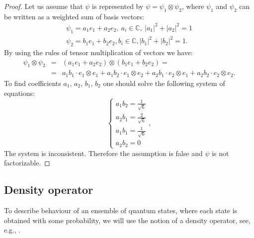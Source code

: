 \documentclass[%
master,         %
subf,           %
href,           %
colorlinks=true %
]{disser}
\numberwithin{equation}{section}
\numberwithin{figure}{section}
\begin{document}
\begin{proof}
Let us assume that $\psi$ is represented by $\psi = \psi_1\otimes\psi_2$, where $\psi_1$ and $\psi_2$ can be written as a weighted sum of basis vectors:
\begin{gather*}
	\psi_1 = a_1 e_1 + a_2 e_2,\ a_i\in \mathbb{C},\ |a_1|^2 + |a_2|^2 = 1 \\
	\psi_2 = b_1 e_1 + b_2 e_2, b_i\in \mathbb{C}, |b_1|^2 + |b_2|^2 = 1.
\end{gather*}
By using the rules of tensor multiplication of vectors we have:
\begin{eqnarray*}
	\psi_1 \otimes \psi_2 &=& (a_1 e_1 + a_2 e_2) \otimes (b_1 e_1 + b_2 e_2) = \\ &=&  
	a_1 b_1 \cdot e_1 \otimes e_1 + a_1 b_2 \cdot e_1 \otimes e_2 + 
	a_2 b_1 \cdot e_2 \otimes e_1 + a_2 b_2 \cdot e_2 \otimes e_2.
\end{eqnarray*}
To find coefficients $a_1$, $a_2$, $b_1$, $b_2$ one should solve the following system of equations:
$$
\begin{cases}
a_1 b_2 = \frac{1}{\sqrt{6}} \\
a_2 b_1 = \frac{2}{\sqrt{6}} \\
a_1 b_1 = \frac{1}{\sqrt{6}} \\
a_2 b_2 = 0
\end{cases},
$$
The system is inconsistent. Therefore the assumption is false and $\psi$ is not factorizable.
\end{proof}


\subsection{Density operator}

To describe behaviour of an ensemble of quantum states, where each state is obtained with some probability, we will use the notion of a density operator, see, e.g., \cite{Khrennikov_information}.
\end{document}
